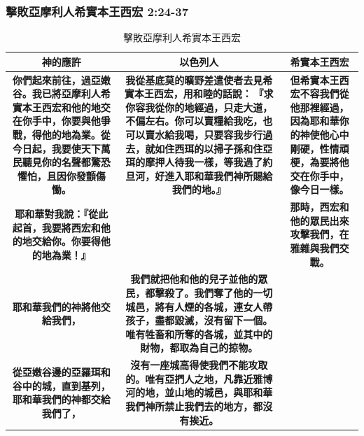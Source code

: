 \subsubsection{擊敗亞摩利人希實本王西宏 2:24-37}
\begin{table}[H]
\begin{threeparttable}
\begin{tabular}{c c c }
\toprule
\multicolumn{1}{L{\dimexpr0.3\linewidth-1\tabcolsep\relax}}{\bfseries 神的應許} 
&\multicolumn{1}{L{\dimexpr0.5\linewidth-1\tabcolsep\relax}}{\bfseries 以色列人}   
&\multicolumn{1}{L{\dimexpr0.2\linewidth-1\tabcolsep\relax}}{\bfseries 希實本王西宏}  \\\hline

\multicolumn{1}{L{\dimexpr0.3\linewidth-1\tabcolsep\relax}}{\bfseries 你們起來前往，過亞嫩谷。我已將亞摩利人希實本王西宏和他的地交在你手中，你要與他爭戰，得他的地為業。從今日起，我要使天下萬民聽見你的名聲都驚恐懼怕，且因你發顫傷慟。} 
&\multicolumn{1}{L{\dimexpr0.5\linewidth-1\tabcolsep\relax}}{\bfseries 我從基底莫的曠野差遣使者去見希實本王西宏，用和睦的話說： 『求你容我從你的地經過，只走大道，不偏左右。你可以賣糧給我吃，也可以賣水給我喝，只要容我步行過去，就如住西珥的以掃子孫和住亞珥的摩押人待我一樣，等我過了約旦河，好進入耶和華我們神所賜給我們的地。』 }   
&\multicolumn{1}{L{\dimexpr0.2\linewidth-1\tabcolsep\relax}}{\bfseries 但希實本王西宏不容我們從他那裡經過，因為耶和華你的神使他心中剛硬，性情頑梗，為要將他交在你手中，像今日一樣。}  \\\hline

\multicolumn{1}{L{\dimexpr0.3\linewidth-1\tabcolsep\relax}}{\bfseries 耶和華對我說：『從此起首，我要將西宏和他的地交給你。你要得他的地為業！』} 
&\multicolumn{1}{L{\dimexpr0.5\linewidth-1\tabcolsep\relax}}{\bfseries  }   
&\multicolumn{1}{L{\dimexpr0.2\linewidth-1\tabcolsep\relax}}{\bfseries 那時，西宏和他的眾民出來攻擊我們，在雅雜與我們交戰。}  \\\hline

\multicolumn{1}{L{\dimexpr0.3\linewidth-1\tabcolsep\relax}}{\bfseries 耶和華我們的神將他交給我們，} 
&\multicolumn{1}{L{\dimexpr0.5\linewidth-1\tabcolsep\relax}}{\bfseries 我們就把他和他的兒子並他的眾民，都擊殺了。我們奪了他的一切城邑，將有人煙的各城，連女人帶孩子，盡都毀滅，沒有留下一個。唯有牲畜和所奪的各城，並其中的財物，都取為自己的掠物。}   
&\multicolumn{1}{L{\dimexpr0.2\linewidth-1\tabcolsep\relax}}{\bfseries }  \\\hline

\multicolumn{1}{L{\dimexpr0.3\linewidth-1\tabcolsep\relax}}{\bfseries 從亞嫩谷邊的亞羅珥和谷中的城，直到基列，耶和華我們的神都交給我們了，} 
&\multicolumn{1}{L{\dimexpr0.5\linewidth-1\tabcolsep\relax}}{\bfseries 沒有一座城高得使我們不能攻取的。唯有亞捫人之地，凡靠近雅博河的地，並山地的城邑，與耶和華我們神所禁止我們去的地方，都沒有挨近。}   
&\multicolumn{1}{L{\dimexpr0.2\linewidth-1\tabcolsep\relax}}{\bfseries }  \\\hline
\bottomrule
\end{tabular}
\caption{擊敗亞摩利人希實本王西宏}
\end{threeparttable}
\end{table} 


